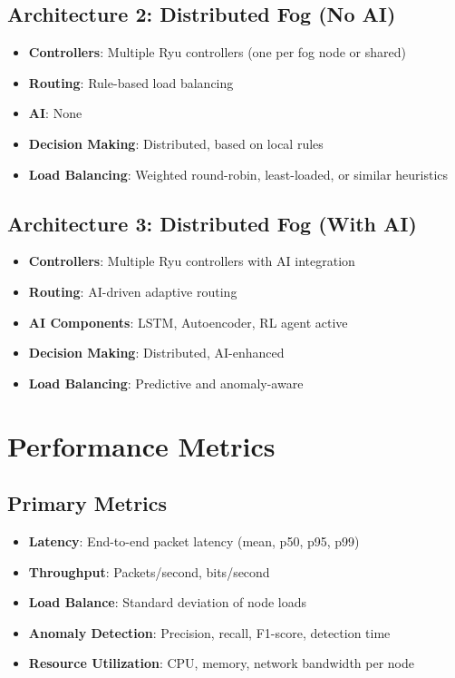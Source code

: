 \documentclass[11pt,a4paper]{article}
\begin{document}
\subsection{Architecture 2: Distributed Fog (No AI)}
\begin{itemize}
    \item \textbf{Controllers}: Multiple Ryu controllers (one per fog node or shared)
    \item \textbf{Routing}: Rule-based load balancing
    \item \textbf{AI}: None
    \item \textbf{Decision Making}: Distributed, based on local rules
    \item \textbf{Load Balancing}: Weighted round-robin, least-loaded, or similar heuristics
\end{itemize}

\subsection{Architecture 3: Distributed Fog (With AI)}
\begin{itemize}
    \item \textbf{Controllers}: Multiple Ryu controllers with AI integration
    \item \textbf{Routing}: AI-driven adaptive routing
    \item \textbf{AI Components}: LSTM, Autoencoder, RL agent active
    \item \textbf{Decision Making}: Distributed, AI-enhanced
    \item \textbf{Load Balancing}: Predictive and anomaly-aware
\end{itemize}

\section{Performance Metrics}

\subsection{Primary Metrics}
\begin{itemize}
    \item \textbf{Latency}: End-to-end packet latency (mean, p50, p95, p99)
    \item \textbf{Throughput}: Packets/second, bits/second
    \item \textbf{Load Balance}: Standard deviation of node loads
    \item \textbf{Anomaly Detection}: Precision, recall, F1-score, detection time
    \item \textbf{Resource Utilization}: CPU, memory, network bandwidth per node
\end{itemize}
\end{document}
